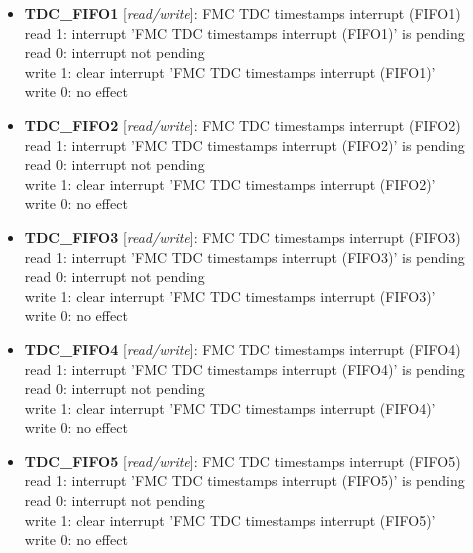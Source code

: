 \begin{itemize}
\item \begin{small}
{\bf 
TDC\_FIFO1
} [\emph{read/write}]: FMC TDC timestamps interrupt (FIFO1)
\\
read 1: interrupt 'FMC TDC timestamps interrupt (FIFO1)' is pending\\read 0: interrupt not pending\\write 1: clear interrupt 'FMC TDC timestamps interrupt (FIFO1)'\\write 0: no effect
\end{small}
\item \begin{small}
{\bf 
TDC\_FIFO2
} [\emph{read/write}]: FMC TDC timestamps interrupt (FIFO2)
\\
read 1: interrupt 'FMC TDC timestamps interrupt (FIFO2)' is pending\\read 0: interrupt not pending\\write 1: clear interrupt 'FMC TDC timestamps interrupt (FIFO2)'\\write 0: no effect
\end{small}
\item \begin{small}
{\bf 
TDC\_FIFO3
} [\emph{read/write}]: FMC TDC timestamps interrupt (FIFO3)
\\
read 1: interrupt 'FMC TDC timestamps interrupt (FIFO3)' is pending\\read 0: interrupt not pending\\write 1: clear interrupt 'FMC TDC timestamps interrupt (FIFO3)'\\write 0: no effect
\end{small}
\item \begin{small}
{\bf 
TDC\_FIFO4
} [\emph{read/write}]: FMC TDC timestamps interrupt (FIFO4)
\\
read 1: interrupt 'FMC TDC timestamps interrupt (FIFO4)' is pending\\read 0: interrupt not pending\\write 1: clear interrupt 'FMC TDC timestamps interrupt (FIFO4)'\\write 0: no effect
\end{small}
\item \begin{small}
{\bf 
TDC\_FIFO5
} [\emph{read/write}]: FMC TDC timestamps interrupt (FIFO5)
\\
read 1: interrupt 'FMC TDC timestamps interrupt (FIFO5)' is pending\\read 0: interrupt not pending\\write 1: clear interrupt 'FMC TDC timestamps interrupt (FIFO5)'\\write 0: no effect

\end{small}
\end{itemize}
